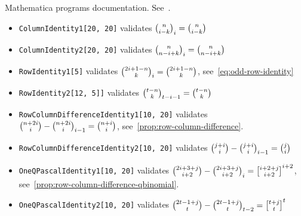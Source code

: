 Mathematica programs documentation.
See~\cite{kolosov2024identities}.
\begin{itemize}
    \item \texttt{ColumnIdentity1[20, 20]} validates $\binom{n}{i-k}_{i} = \binom{n}{i-k}$
    \item \texttt{ColumnIdentity2[20, 20]} validates $\binom{n}{n-i+k}_{i} = \binom{n}{n-i+k}$
    \item \texttt{RowIdentity1[5]} validates $\binom{2i+1-n}{k}_{i} = \binom{2i+1-n}{k}$, see~\eqref{eq:odd-row-identity}
    \item \texttt{RowIdentity2[12, 5]]} validates $\binom{t-n}{k}_{t-i-1}= \binom{t-n}{k}$
    \item \texttt{RowColumnDifferenceIdentity1[10, 20]} validates $\binom{n+2i}{i} - \binom{n+2i}{i}_{i-1} = \binom{n+i}{i}$, see~\eqref{prop:row-column-difference}.
    \item \texttt{RowColumnDifferenceIdentity2[10, 20]} validates $\binom{j+i}{i} - \binom{j+i}{i}_{i-1} = \binom{j}{i}$
    \item \texttt{OneQPascalIdentity1[10, 20]} validates $\binom{2i+3+j}{i+2} - \rascalNumber{2i+3+j}{i+2}{i} = \oneQBinomial{i+2+j}{i+2}{i+2}$, see~\eqref{prop:row-column-difference-qbinomial}.
    \item \texttt{OneQPascalIdentity2[10, 20]} validates $\binom{2t-1+j}{t} - \rascalNumber{2t-1+j}{t}{t-2} = \oneQBinomial{t+j}{t}{t}$
\end{itemize}
